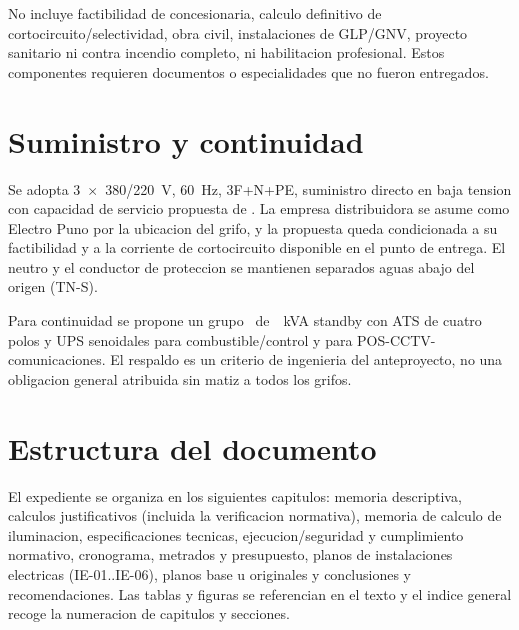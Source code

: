 No incluye factibilidad de concesionaria, calculo definitivo de
cortocircuito/selectividad, obra civil, instalaciones de GLP/GNV, proyecto
sanitario ni contra incendio completo, ni habilitacion profesional. Estos
componentes requieren documentos o especialidades que no fueron entregados.

\section{Suministro y continuidad}
Se adopta 3~\(\times\)~380/220~V, 60~Hz, 3F+N+PE, suministro directo en baja
tension con capacidad de servicio propuesta de \ServCap. La empresa
distribuidora se asume como Electro Puno por la ubicacion del grifo, y la
propuesta queda condicionada a su factibilidad y a la corriente de
cortocircuito disponible en el punto de entrega. El neutro y el conductor de
proteccion se mantienen separados aguas abajo del origen (TN-S).

Para continuidad se propone un grupo \GrupoModelo~de~\GrupoNom~kVA standby con
ATS de cuatro polos y UPS senoidales para combustible/control y para
POS-CCTV-comunicaciones. El respaldo es un criterio de ingenieria del
anteproyecto, no una obligacion general atribuida sin matiz a todos los
grifos.

\section{Estructura del documento}
El expediente se organiza en los siguientes capitulos: memoria descriptiva,
calculos justificativos (incluida la verificacion normativa), memoria de
calculo de iluminacion, especificaciones tecnicas, ejecucion/seguridad y
cumplimiento normativo, cronograma, metrados y presupuesto, planos de
instalaciones electricas (IE-01..IE-06), planos base u originales y
conclusiones y recomendaciones. Las tablas y figuras se referencian en el
texto y el indice general recoge la numeracion de capitulos y secciones.
